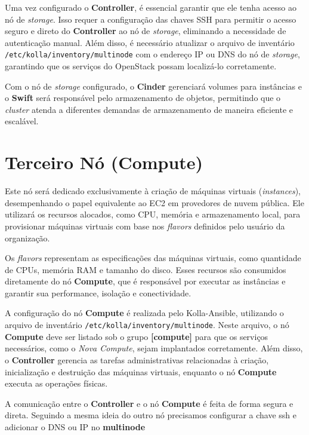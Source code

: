 Uma vez configurado o \textbf{Controller}, é essencial garantir que ele tenha acesso ao nó de \textit{storage}. Isso requer a configuração das chaves SSH para permitir o acesso seguro e direto do \textbf{Controller} ao nó de \textit{storage}, eliminando a necessidade de autenticação manual. Além disso, é necessário atualizar o arquivo de inventário \texttt{/etc/kolla/inventory/multinode} com o endereço IP ou DNS do nó de \textit{storage}, garantindo que os serviços do OpenStack possam localizá-lo corretamente.

Com o nó de \textit{storage} configurado, o \textbf{Cinder} gerenciará volumes para instâncias e o \textbf{Swift} será responsável pelo armazenamento de objetos, permitindo que o \textit{cluster} atenda a diferentes demandas de armazenamento de maneira eficiente e escalável.


\section{Terceiro Nó (Compute)}

Este nó será dedicado exclusivamente à criação de máquinas virtuais (\textit{instances}), desempenhando o papel equivalente ao EC2 em provedores de nuvem pública. Ele utilizará os recursos alocados, como CPU, memória e armazenamento local, para provisionar máquinas virtuais com base nos \textit{flavors} definidos pelo usuário da organização.

Os \textit{flavors} representam as especificações das máquinas virtuais, como quantidade de CPUs, memória RAM e tamanho do disco. Esses recursos são consumidos diretamente do nó \textbf{Compute}, que é responsável por executar as instâncias e garantir sua performance, isolação e conectividade.

A configuração do nó \textbf{Compute} é realizada pelo Kolla-Ansible, utilizando o arquivo de inventário \texttt{/etc/kolla/inventory/multinode}. Neste arquivo, o nó \textbf{Compute} deve ser listado sob o grupo \textbf{[compute]} para que os serviços necessários, como o \textit{Nova Compute}, sejam implantados corretamente. Além disso, o \textbf{Controller} gerencia as tarefas administrativas relacionadas à criação, inicialização e destruição das máquinas virtuais, enquanto o nó \textbf{Compute} executa as operações físicas.

A comunicação entre o \textbf{Controller} e o nó \textbf{Compute} é feita de forma segura e direta. Seguindo a mesma ideia do outro nó precisamos configurar a chave ssh e adicionar o DNS ou IP no \textbf{multinode}

